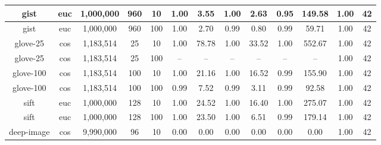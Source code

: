 \begin{table*}[!t]
\begin{center}
\begin{small}
\begin{sc}
\begin{tabular}{|c|c|c|c|c|c|c|c|c|c|c|c|c|}
    \hline 
    gist             & euc              & 1,000,000          & 960             & 10         & 1.00 & 3.55                           & 1.00 & 2.63                                     & 0.95 & 149.58                                                   & 1.00 & 42 \\
    \hline
    gist             & euc              & 1,000,000          & 960             & 100        & 1.00 & 2.70                           & 0.99 & 0.80                                 & 0.99 & 59.71                                                    & 1.00 & 42 \\
    \hline
    glove-25         & cos              & 1,183,514          & 25             & 10         & 1.00 & 78.78                          & 1.00 & 33.52                              & 1.00 & 552.67                                                  & 1.00 & 42 \\
    \hline
    glove-25         & cos              & 1,183,514          & 25             & 100        & -- & --                                & -- & --                                & -- & --                                                    & 1.00 & 42 \\
    \hline
    glove-100        & cos              & 1,183,514          & 100            & 10         & 1.00 & 21.16                          & 1.00 & 16.52                                & 0.99 & 155.90                                                  & 1.00 & 42 \\
    \hline
    glove-100        & cos              & 1,183,514          & 100            & 100        & 0.99 &  7.52                          & 0.99 & 3.11                                  & 0.99 & 92.58                                                    & 1.00 & 42 \\
    \hline
    sift             & euc              & 1,000,000          & 128            & 10         & 1.00 &  24.52                          & 1.00 & 16.40                               & 1.00 & 275.07                                                    & 1.00 & 42 \\
    \hline
    sift             & euc              & 1,000,000          & 128            & 100        & 1.00 &  23.50                          & 1.00 & 6.51                                  & 0.99 & 179.14                                                    & 1.00 & 42 \\
    \hline
    deep-image       & cos              & 9,990,000	         & 96             & 10          & 0.00 & 0.00                           & 0.00 & 0.00                                 & 0.00 & 0.00                                                     & 1.00 & 42 \\

\end{tabular}
\end{sc}
\end{small}
\end{center}
\end{table*}
